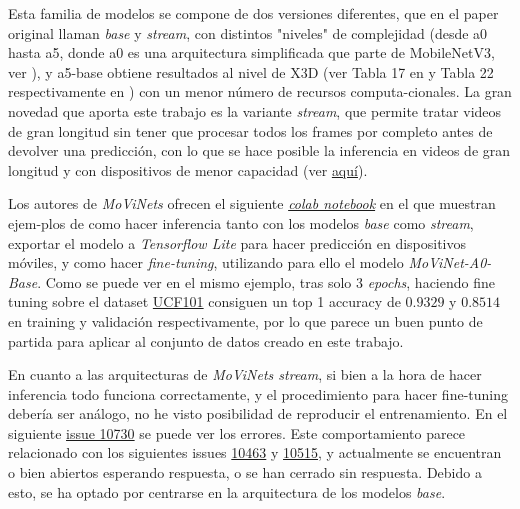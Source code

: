Esta familia de modelos se compone de dos versiones diferentes, que en el paper original llaman \textit{base} y \textit{stream}, con distintos "niveles" de complejidad (desde a0 hasta a5, donde a0 es una arquitectura simplificada que parte de MobileNetV3, ver \cite{MobileNetV3}), y a5-base obtiene resultados al nivel de X3D \cite{X3D} (ver Tabla 17 en y Tabla 22 respectivamente en \cite{MoViNets}) con un menor número de recursos computa-cionales. La gran novedad que aporta este trabajo es la variante \textit{stream}, que permite tratar videos de gran longitud sin tener que procesar todos los frames por completo antes de devolver una predicción, con lo que se hace posible la inferencia en videos de gran longitud y con dispositivos de menor capacidad (ver \href{https://blog.tensorflow.org/2022/04/video-classification-on-edge-devices.html}{aquí}).

Los autores de \textit{MoViNets} ofrecen el siguiente \href{https://colab.research.google.com/github/tensorflow/models/blob/master/official/projects/movinet/movinet_tutorial.ipynb}{\textit{colab notebook}} en el que muestran ejem-plos de como hacer inferencia tanto con los modelos \textit{base} como \textit{stream}, exportar el modelo a \textit{Tensorflow Lite} para hacer predicción en dispositivos móviles, y como hacer \textit{fine-tuning}, utilizando para ello el modelo \textit{MoViNet-A0-Base}. Como se puede ver en el mismo ejemplo, tras solo 3 \textit{epochs}, haciendo fine tuning sobre el dataset \href{https://www.tensorflow.org/datasets/catalog/ucf101}{UCF101} consiguen un top 1 accuracy de $0.9329$ y $0.8514$ en training y validación respectivamente, por lo que parece un buen punto de partida para aplicar al conjunto de datos creado en este trabajo.

En cuanto a las arquitecturas de \textit{MoViNets stream}, si bien a la hora de hacer inferencia todo funciona correctamente, y el procedimiento para hacer fine-tuning debería ser análogo, no he visto posibilidad de reproducir el entrenamiento. En el siguiente \href{https://github.com/tensorflow/models/issues/10730}{issue 10730} se puede ver los errores. Este comportamiento parece relacionado con los siguientes issues \href{https://github.com/tensorflow/models/issues/10463#issuecomment-1019395406_}{10463} y \href{https://github.com/tensorflow/models/issues/10515}{10515}, y actualmente se encuentran o bien abiertos esperando respuesta, o se han cerrado sin respuesta. Debido a esto, se ha optado por centrarse en la arquitectura de los modelos \textit{base}.



